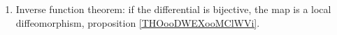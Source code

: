 
\begin{enumerate}
	\item
	      Inverse function theorem: if the differential is bijective, the map is a local diffeomorphism, proposition \ref{THOooDWEXooMClWVi}.
\end{enumerate}
